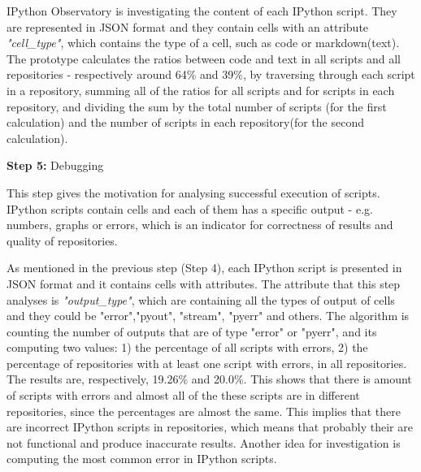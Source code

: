 IPython Observatory is investigating the content of each IPython script. They are represented in JSON format\cite{json} and they contain cells with an attribute \textit{"cell\_type"}, which contains the type of a cell, such as code or markdown(text). The prototype calculates the ratios between code and text in all scripts and all repositories - respectively around 64\% and 39\%, by traversing through each script in a repository, summing all of the ratios for all scripts and for scripts in each repository, and dividing the sum by the total number of scripts (for the first calculation) and the number of scripts in each repository(for the second calculation). 

\vspace{5mm}
\begin{mdframed}
\vspace{1px}
\textbf{Step 5:} Debugging
\vspace{1px}
\end{mdframed}

This step gives the motivation for analysing successful execution of scripts. IPython scripts contain cells and each of them has a specific output - e.g. numbers, graphs or errors, which is an indicator for correctness of results and quality of repositories. 

As mentioned in the previous step (Step 4), each IPython script is presented in JSON format and it contains cells with attributes. The attribute that this step analyses is \textit{"output\_type"}, which are containing all the types of output of cells and they could be "error","pyout", "stream", "pyerr" and others. The algorithm is counting the number of outputs that are of type "error" or "pyerr", and its computing two values: 1) the percentage of all scripts with errors, 2) the percentage of repositories with at least one script with errors, in all repositories. The results are, respectively, 19.26\% and 20.0\%. This shows that there is amount of scripts with errors and almost all of the these scripts are in different repositories, since the percentages are almost the same. This implies that there are incorrect IPython scripts in repositories, which means that probably their are not functional and produce inaccurate results. Another idea for investigation is computing the most common error in IPython scripts. 

